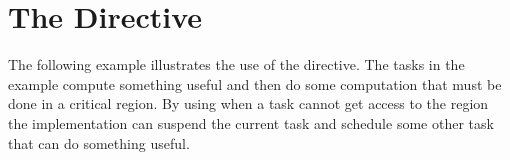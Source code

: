 \pagebreak
\chapter{The  Directive}
\label{chap:taskyield}

The following example illustrates the use of the   directive. 
The tasks in the example compute something useful and then do some computation 
that must be done in a critical region. By using  when a task 
cannot get access to the  region the implementation can suspend 
the current task and schedule some other task that can do something useful. 



